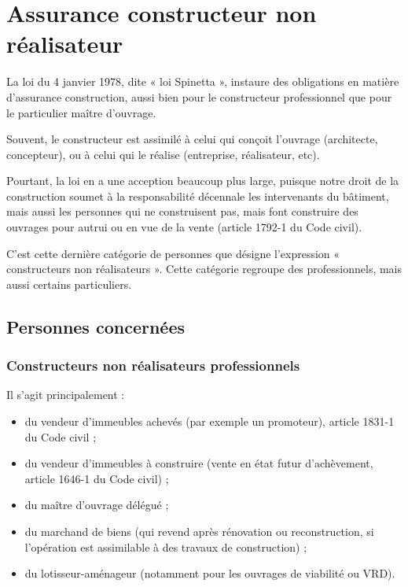 
\chapter{Assurance constructeur non réalisateur}

La loi du 4 janvier 1978, dite « loi Spinetta », instaure des obligations en matière d'assurance construction, aussi bien pour le constructeur professionnel que pour le particulier maître d'ouvrage.

Souvent, le constructeur est assimilé à celui qui conçoit l'ouvrage (architecte, concepteur), ou à celui qui le réalise (entreprise, réalisateur, etc).

Pourtant, la loi en a une acception beaucoup plus large, puisque notre droit de la construction soumet à la responsabilité décennale les intervenants du bâtiment, mais aussi les personnes qui ne construisent pas, mais font construire des ouvrages pour autrui ou en vue de la vente (article 1792-1 du Code civil).

C'est cette dernière catégorie de personnes que désigne l'expression « constructeurs non réalisateurs ». Cette catégorie regroupe des professionnels, mais aussi certains particuliers.

\section{Personnes concernées}

  \subsection{Constructeurs non réalisateurs professionnels}

    Il s'agit principalement :
    \begin{itemize}
      \item du vendeur d'immeubles achevés (par exemple un promoteur), article 1831-1 du Code civil ;
      \item du vendeur d'immeubles à construire (vente en état futur d'achèvement, article 1646-1 du Code civil) ;
      \item du maître d'ouvrage délégué ;
      \item du marchand de biens (qui revend après rénovation ou reconstruction, si l'opération est assimilable à des travaux de construction) ;
      \item du lotisseur-aménageur (notamment pour les ouvrages de viabilité ou VRD).
    \end{itemize}

